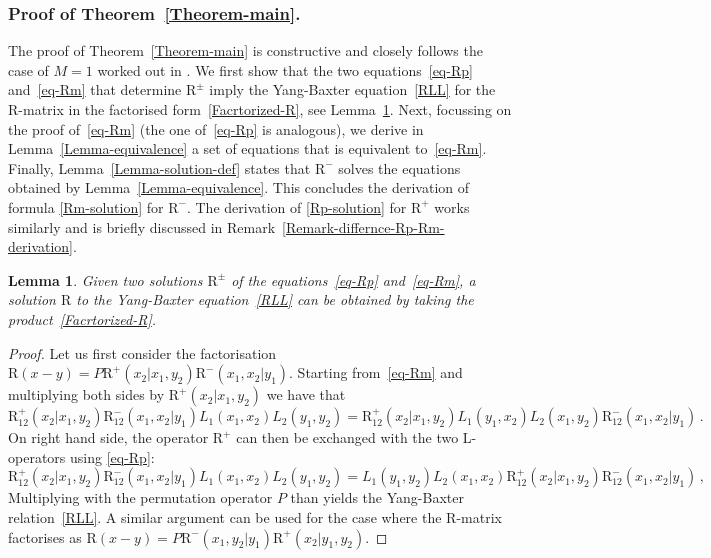 \documentclass[11pt]{article}
\numberwithin{equation}{section}
\newtheorem{lemma}[theorem]{Lemma}
\newcommand{\abrOSCR}{\mathrm{R}}
\begin{document}
\subsubsection{Proof of Theorem~\ref{Theorem-main}.}
The proof of Theorem~\ref{Theorem-main} is constructive and closely follows the case of $M=1$ worked out in \cite{Derkachov:2005hw}. We first show that the two equations~\eqref{eq-Rp} and~\eqref{eq-Rm} that determine $\abrOSCR^\pm$ imply the  Yang-Baxter equation~\eqref{RLL} for the R-matrix in the factorised form~\eqref{Facrtorized-R}, see Lemma~\ref{lem1}. Next, focussing on the proof of~\eqref{eq-Rm} (the one of~\eqref{eq-Rp} is analogous), we derive in Lemma~\ref{Lemma-equivalence} a set of equations that is equivalent to~\eqref{eq-Rm}. Finally, Lemma~\ref{Lemma-solution-def} states that $\abrOSCR^-$ solves the equations obtained by Lemma~\ref{Lemma-equivalence}. This concludes the derivation of formula \eqref{Rm-solution} for $\abrOSCR^-$. The derivation of \eqref{Rp-solution} for $\abrOSCR^+$ works similarly and is briefly discussed in Remark~\ref{Remark-differnce-Rp-Rm-derivation}.






\begin{lemma}\label{lem1}
Given two solutions  $\abrOSCR^\pm$ of the equations~\eqref{eq-Rp} and~\eqref{eq-Rm}, a solution $\abrOSCR$ to the Yang-Baxter equation~\eqref{RLL} can be obtained by taking the product~\eqref{Facrtorized-R}.
\end{lemma}

\begin{proof}
Let us first consider the factorisation $\abrOSCR(x-y)=P\abrOSCR^{+}(x_{2}|x_{1},y_{2})\abrOSCR^{-}(x_{1},x_{2}|y_{1})$.  Starting from~\eqref{eq-Rm}
and multiplying both sides by $\abrOSCR^{+}(x_{2}|x_{1},y_{2})$ we have that
\begin{equation}\label{here-R}
\abrOSCR^{+}_{12}(x_{2}|x_{1},y_{2})\abrOSCR^-_{12}(x_1,x_2|y_1) L_1(x_1,x_2)L_2(y_1,y_2)=\abrOSCR^{+}_{12}(x_{2}|x_{1},y_{2})L_1(y_1,x_2)L_2(x_1,y_2)\abrOSCR^-_{12}(x_1,x_2|y_1)\,.
\end{equation}
On right hand side, the operator $\abrOSCR^+$  can then be exchanged with the two L-operators using
\eqref{eq-Rp}:
\begin{equation}
\abrOSCR^{+}_{12}(x_{2}|x_{1},y_{2})\abrOSCR^-_{12}(x_1,x_2|y_1) L_1(x_1,x_2)L_2(y_1,y_2)=L_1(y_1,y_2)L_2(x_1,x_2)\abrOSCR^{+}_{12}(x_{2}|x_{1},y_{2})\abrOSCR^-_{12}(x_1,x_2|y_1)\,,
\end{equation}
Multiplying with the permutation operator $P$ than yields  the Yang-Baxter relation~\eqref{RLL}. A similar argument can be used for the case where the R-matrix factorises as $\abrOSCR(x-y)= P\abrOSCR^-(x_1,y_2|y_1)\abrOSCR^+(x_2|y_1,y_2)$.


\end{proof}
\end{document}
